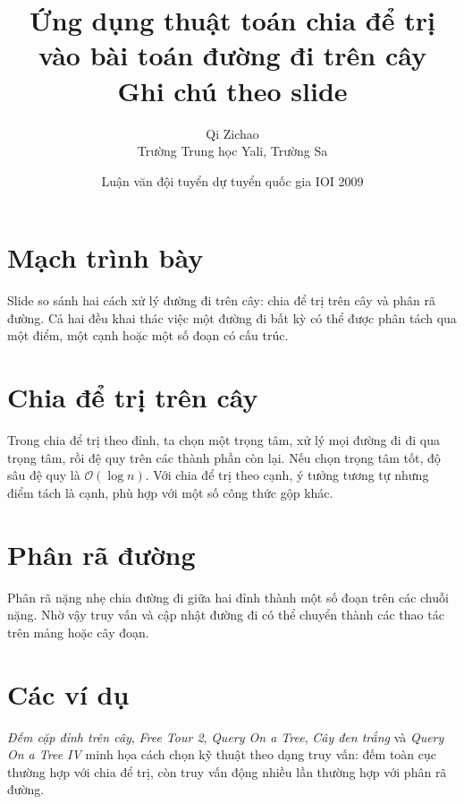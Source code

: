 \documentclass[11pt]{article}
\title{Ứng dụng thuật toán chia để trị vào bài toán đường đi trên cây\\{\large Ghi chú theo slide}}
\author{Qi Zichao\\Trường Trung học Yali, Trường Sa}
\date{Luận văn đội tuyển dự tuyển quốc gia IOI 2009}
\newcommand{\Oh}{\mathcal{O}}
\begin{document}
\maketitle


\section{Mạch trình bày}

Slide so sánh hai cách xử lý đường đi trên cây: chia để trị trên cây và phân
rã đường. Cả hai đều khai thác việc một đường đi bất kỳ có thể được phân tách
qua một điểm, một cạnh hoặc một số đoạn có cấu trúc.

\section{Chia để trị trên cây}

Trong chia để trị theo đỉnh, ta chọn một trọng tâm, xử lý mọi đường đi đi qua
trọng tâm, rồi đệ quy trên các thành phần còn lại. Nếu chọn trọng tâm tốt,
độ sâu đệ quy là \(\Oh(\log n)\). Với chia để trị theo cạnh, ý tưởng tương tự
nhưng điểm tách là cạnh, phù hợp với một số công thức gộp khác.

\section{Phân rã đường}

Phân rã nặng nhẹ chia đường đi giữa hai đỉnh thành một số đoạn trên các chuỗi
nặng. Nhờ vậy truy vấn và cập nhật đường đi có thể chuyển thành các thao tác
trên mảng hoặc cây đoạn.

\section{Các ví dụ}

\textit{Đếm cặp đỉnh trên cây}, \textit{Free Tour 2}, \textit{Query On a
Tree}, \textit{Cây đen trắng} và \textit{Query On a Tree IV} minh họa cách
chọn kỹ thuật theo dạng truy vấn: đếm toàn cục thường hợp với chia để trị,
còn truy vấn động nhiều lần thường hợp với phân rã đường.
\end{document}
